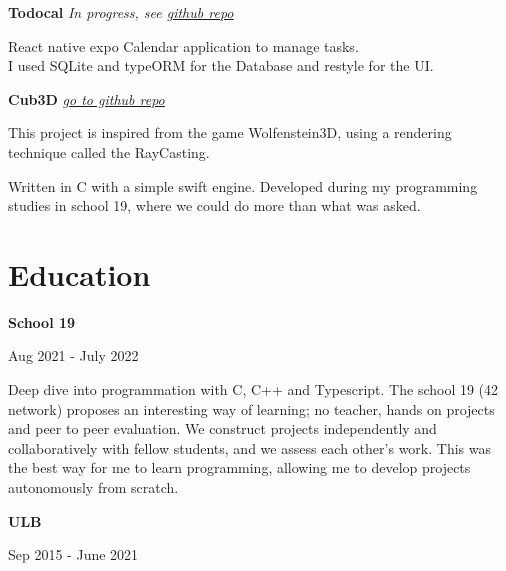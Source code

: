 \documentclass[11pt, oneside, a4paper, titlepage]{article}
\begin{document}
\begin{tcolorbox}[colframe=white, colback=white]
\begin{minipage}[t]{0.60\linewidth}
    \textbf{Todocal}
    \emph{In progress, see 
      \href{https://github.com/tamighi/todocal}{\underline{github repo}}
    }
    \medbreak

    \small{
      React native expo Calendar application to manage tasks. \\
      I used SQLite and typeORM for the Database and restyle for the UI.
    }
    \vspace{0.3cm}

    \textbf{Cub3D}
    \emph{
      \href{https://github.com/Lysique/cub3d}{\underline{go to github repo}}
    }
    \medbreak

    This project is inspired from the game Wolfenstein3D, using a rendering 
    technique called the RayCasting.

    Written in C with a simple swift engine. Developed during my programming 
    studies in school 19, where we could do more than what was asked.
    \section*{Education}

    \begin{minipage}{0.45\linewidth}
      \textbf{School 19}
    \end{minipage}
    \begin{minipage}{0.5\linewidth}
      \begin{flushright}
        Aug 2021 - July 2022
      \end{flushright}
    \end{minipage}
    \vspace{0.3cm}

    \small{
      Deep dive into programmation with C, C++ and Typescript. The school 19 
      (42 network) proposes an interesting way of learning; no teacher, hands 
      on projects and peer to peer evaluation. We construct projects 
      independently and collaboratively with fellow students, and we assess 
      each other's work.
      This was the best way for me to learn programming, allowing me to develop 
      projects autonomously from scratch.
    }
    \vspace{0.2cm}

    \vspace{0.3cm}

    \begin{minipage}{0.45\linewidth}
      \textbf{ULB}
    \end{minipage}
    \begin{minipage}{0.5\linewidth}
      \begin{flushright}
        Sep 2015 - June 2021
      \end{flushright}
    \end{minipage}
    \vspace{0.3cm}


\end{minipage}
\end{tcolorbox}
\end{document}
